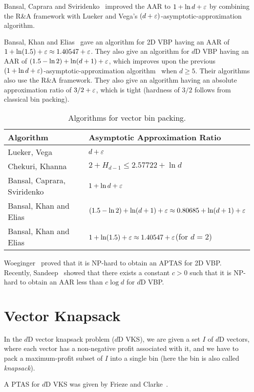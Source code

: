 Bansal, Caprara and Sviridenko~\cite{rna} improved the AAR to
$1 + \ln d + \varepsilon$ by combining the R\&A framework with Lueker and Vega's
$(d+\varepsilon)$-asymptotic-approximation algorithm.

Bansal, Khan and Elias~\cite{bansal2016improved} gave an algorithm for 2D VBP
having an AAR of $1 + \ln(1.5) + \varepsilon \approx 1.40547 + \varepsilon$.
They also give an algorithm for $d$D VBP having an AAR of
$(1.5 - \ln 2) + \ln(d+1) + \varepsilon$, which improves upon the previous
$(1 + \ln d + \varepsilon)$-asymptotic-approximation algorithm~\cite{rna} when $d \ge 5$.
Their algorithms also use the R\&A framework.
They also give an algorithm having an absolute approximation ratio of $3/2 + \varepsilon$,
which is tight (hardness of $3/2$ follows from classical bin packing).

\begin{table}[ht]
\centering
\caption{Algorithms for vector bin packing.}
\begin{tabular}{ll}
\toprule Algorithm & Asymptotic Approximation Ratio
\\ \midrule Lueker, Vega~\cite{bp-aptas}
    & $d+\varepsilon$
\\[\defaultaddspace] Chekuri, Khanna~\cite{chekuri-khanna-vbp}
    & $2 + H_{d-1} \le 2.57722 + \ln d$
\\[\defaultaddspace] Bansal, Caprara, Sviridenko~\cite{rna}
    & $1 + \ln d + \varepsilon$
\\[\defaultaddspace] Bansal, Khan and Elias~\cite{bansal2016improved}
    & $(1.5 - \ln 2) + \ln(d+1) + \varepsilon \approx 0.80685 + \ln(d+1) + \varepsilon$
\\[\defaultaddspace] Bansal, Khan and Elias~\cite{bansal2016improved}
    & $1 + \ln(1.5) + \varepsilon \approx 1.40547 + \varepsilon$\quad (for $d=2$)
\\ \bottomrule
\end{tabular}
\label{table:vbp}
\end{table}

Woeginger~\cite{woeginger1997there} proved that it is NP-hard to obtain an APTAS for 2D VBP.
Recently, Sandeep~\cite{sandeep2021optimal} showed that there exists a constant $c > 0$ such that
it is NP-hard to obtain an AAR less than $c\log d$ for $d$D VBP.

\section{Vector Knapsack}

In the $d$D vector knapsack problem ($d$D VKS), we are given a set $I$ of $d$D vectors,
where each vector has a non-negative profit associated with it,
and we have to pack a maximum-profit subset of $I$ into a single bin
(here the bin is also called \emph{knapsack}).

A PTAS for $d$D VKS was given by Frieze and Clarke~\cite{frieze1984approximation}.
